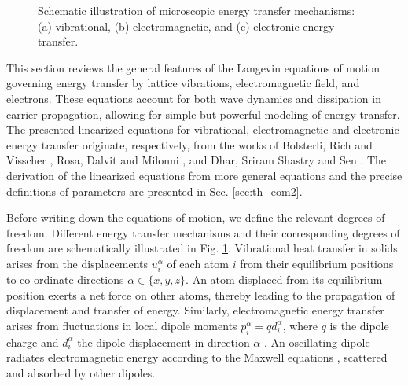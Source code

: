 \begin{figure}
 \begin{center}
 \end{center}
 \caption{Schematic illustration of microscopic energy transfer mechanisms: (a) vibrational, (b) electromagnetic, and (c) electronic energy transfer.}
 \label{fig:mechanisms}
\end{figure}

This section reviews the general features of the Langevin equations of motion governing energy transfer by lattice vibrations, electromagnetic field, and electrons. These equations account for both wave dynamics and dissipation in carrier propagation, allowing for simple but powerful modeling of energy transfer. The presented linearized equations for vibrational, electromagnetic and electronic energy transfer originate, respectively, from the works of Bolsterli, Rich and Visscher \cite{bolsterli70}, Rosa, Dalvit and Milonni \cite{rosa10,rosa11}, and Dhar, Sriram Shastry and Sen \cite{dhar03,dhar06b}. The derivation of the linearized equations from more general equations and the precise definitions of parameters are presented in Sec. \ref{sec:th_eom2}. %

Before writing down the equations of motion, we define the relevant degrees of freedom. Different energy transfer mechanisms and their corresponding degrees of freedom are schematically illustrated in Fig. \ref{fig:mechanisms}. Vibrational heat transfer in solids arises from the displacements $u_i^{\alpha}$ of each atom $i$ from their equilibrium positions to co-ordinate directions $\alpha\in\{x,y,z\}$. An atom displaced from its equilibrium position exerts a net force on other atoms, thereby leading to the propagation of displacement and transfer of energy. Similarly, electromagnetic energy transfer arises from fluctuations in local dipole moments $p_i^{\alpha}=qd_i^{\alpha}$, where $q$ is the dipole charge and $d_i^{\alpha}$ the dipole displacement in direction $\alpha$ \cite{rosa10}. An oscillating dipole radiates electromagnetic energy according to the Maxwell equations \cite{novotny}, scattered and absorbed by other dipoles. 

